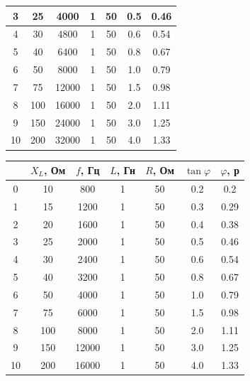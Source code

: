 \documentclass[a4paper,12pt]{article}
\begin{document}
\begin{justify}
\begin{table}[htp]
\begin{tabular}{|c|c|c|c|c|c|c|}
3  & 25        & 4000    & 1       & 50      & 0.5           & 0.46         \\ \hline
4  & 30        & 4800    & 1       & 50      & 0.6           & 0.54         \\ \hline
5  & 40        & 6400    & 1       & 50      & 0.8           & 0.67         \\ \hline
6  & 50        & 8000    & 1       & 50      & 1.0           & 0.79         \\ \hline
7  & 75        & 12000   & 1       & 50      & 1.5           & 0.98         \\ \hline
8  & 100       & 16000   & 1       & 50      & 2.0           & 1.11         \\ \hline
9  & 150       & 24000   & 1       & 50      & 3.0           & 1.25         \\ \hline
10 & 200       & 32000   & 1       & 50      & 4.0           & 1.33         \\ \hline
\end{tabular}
\end{table}
\begin{table}[htp]
\centering
\begin{tabular}{|c|c|c|c|c|c|c|}
\hline
   & $X_L$, Ом & $f$, Гц & $L$, Гн & $R$, Ом & $\tan\varphi$ & $\varphi$, р \\ \hline
0  & 10        & 800     & 1       & 50      & 0.2           & 0.2          \\ \hline
1  & 15        & 1200    & 1       & 50      & 0.3           & 0.29         \\ \hline
2  & 20        & 1600    & 1       & 50      & 0.4           & 0.38         \\ \hline
3  & 25        & 2000    & 1       & 50      & 0.5           & 0.46         \\ \hline
4  & 30        & 2400    & 1       & 50      & 0.6           & 0.54         \\ \hline
5  & 40        & 3200    & 1       & 50      & 0.8           & 0.67         \\ \hline
6  & 50        & 4000    & 1       & 50      & 1.0           & 0.79         \\ \hline
7  & 75        & 6000    & 1       & 50      & 1.5           & 0.98         \\ \hline
8  & 100       & 8000    & 1       & 50      & 2.0           & 1.11         \\ \hline
9  & 150       & 12000   & 1       & 50      & 3.0           & 1.25         \\ \hline
10 & 200       & 16000   & 1       & 50      & 4.0           & 1.33         \\ \hline
\end{tabular}
\end{table}
\newpage

\end{justify}
\end{document}
